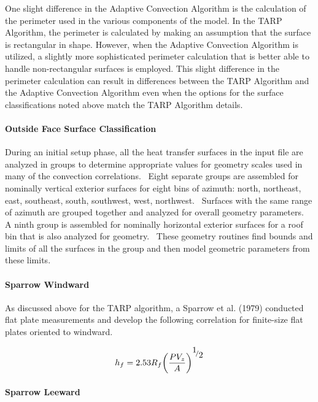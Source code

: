 One slight difference in the Adaptive Convection Algorithm is the calculation of the perimeter used in the various components of the model.  In the TARP Algorithm, the perimeter is calculated by making an assumption that the surface is rectangular in shape.  However, when the Adaptive Convection Algorithm is utilized, a slightly more sophisticated perimeter calculation that is better able to handle non-rectangular surfaces is employed.  This slight difference in the perimeter calculation can result in differences between the TARP Algorithm and the Adaptive Convection Algorithm even when the options for the surface classifications noted above match the TARP Algorithm details.

\paragraph{Outside Face Surface Classification}\label{outside-face-surface-classification}

During an initial setup phase, all the heat transfer surfaces in the input file are analyzed in groups to determine appropriate values for geometry scales used in many of the convection correlations.~ Eight separate groups are assembled for nominally vertical exterior surfaces for eight bins of azimuth: north, northeast, east, southeast, south, southwest, west, northwest.~ Surfaces with the same range of azimuth are grouped together and analyzed for overall geometry parameters.~ A ninth group is assembled for nominally horizontal exterior surfaces for a roof bin that is also analyzed for geometry.~ These geometry routines find bounds and limits of all the surfaces in the group and then model geometric parameters from these limits.

\paragraph{Sparrow Windward}\label{sparrow-windward}

As discussed above for the TARP algorithm, a Sparrow et al. (1979) conducted flat plate measurements and develop the following correlation for finite-size flat plates oriented to windward.

\begin{equation}
{h_f} = 2.53{R_f}{\left( {\frac{{P{V_z}}}{A}} \right)^{{\raise0.7ex\hbox{1} \!\mathord{\left/ {\vphantom {1 2}}\right.}\!\lower0.7ex\hbox{2}}}}
\end{equation}

\paragraph{Sparrow Leeward}\label{sparrow-leeward}

